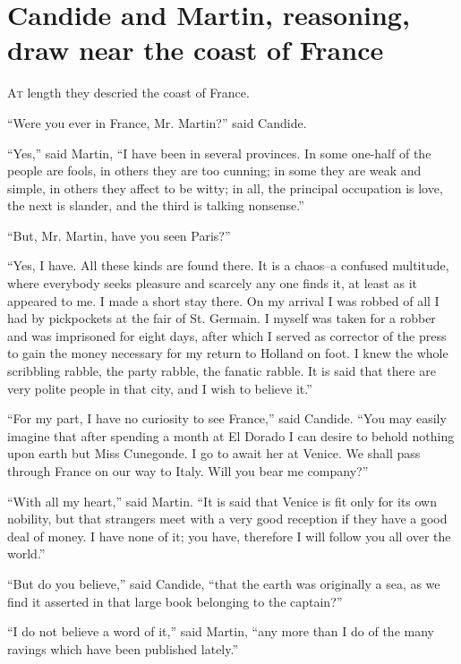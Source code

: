 \vspace{1cm}
\begingroup
\let\clearpage\relax
\chapter{Candide and Martin, reasoning,  draw near the coast of France}
\endgroup
\vspace{-1cm}
\lettrine[lraise=0.1,nindent=0em,slope=-.5em]{A}{t} length they descried the coast of France.

``Were you ever in France, Mr. Martin?'' said Candide.

``Yes,'' said Martin, ``I have been in several provinces. In some one-half of the people are fools, in others they are too cunning; in some they are weak and simple, in others they affect to be witty; in all, the principal occupation is love, the next is slander, and the third is talking nonsense.''

``But, Mr. Martin, have you seen Paris?''

``Yes, I have. All these kinds are found there. It is a chaos--a confused multitude, where everybody seeks pleasure and scarcely any one finds it, at least as it appeared to me. I made a short stay there. On my arrival I was robbed of all I had by pickpockets at the fair of St. Germain. I myself was taken for a robber and was imprisoned for eight days, after which I served as corrector of the press to gain the money necessary for my return to Holland on foot. I knew the whole scribbling rabble, the party rabble, the fanatic rabble. It is said that there are very polite people in that city, and I wish to believe it.''

``For my part, I have no curiosity to see France,'' said Candide. ``You may easily imagine that after spending a month at El Dorado I can desire to behold nothing upon earth but Miss Cunegonde. I go to await her at Venice. We shall pass through France on our way to Italy. Will you bear me company?''

``With all my heart,'' said Martin. ``It is said that Venice is fit only for its own nobility, but that strangers meet with a very good reception if they have a good deal of money. I have none of it; you have, therefore I will follow you all over the world.''

``But do you believe,'' said Candide, ``that the earth was originally a sea, as we find it asserted in that large book belonging to the captain?''

``I do not believe a word of it,'' said Martin, ``any more than I do of the many ravings which have been published lately.''

